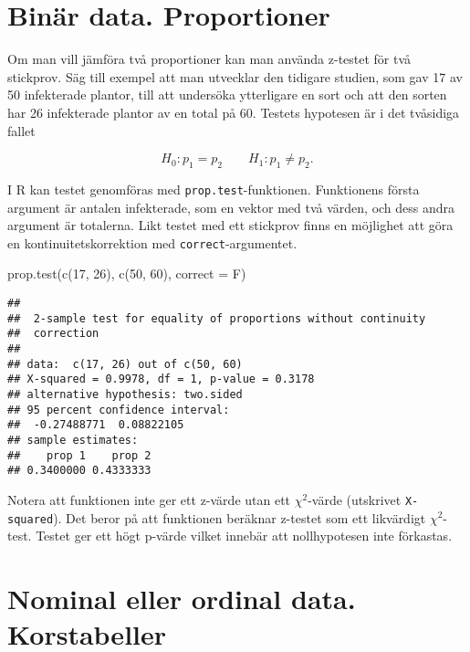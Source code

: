 \documentclass[
]{book}
\newenvironment{Shaded}{\begin{snugshade}}{\end{snugshade}}
\newcommand{\AttributeTok}[1]{\textcolor[rgb]{0.77,0.63,0.00}{#1}}
\newcommand{\DecValTok}[1]{\textcolor[rgb]{0.00,0.00,0.81}{#1}}
\newcommand{\FunctionTok}[1]{\textcolor[rgb]{0.00,0.00,0.00}{#1}}
\newcommand{\NormalTok}[1]{#1}
\theoremstyle{definition}
\theoremstyle{definition}
\theoremstyle{definition}
\theoremstyle{definition}
\theoremstyle{remark}
\begin{document}
\hypertarget{binuxe4r-data.-proportioner-1}{%
\section{Binär data. Proportioner}\label{binuxe4r-data.-proportioner-1}}

Om man vill jämföra två proportioner kan man använda z-testet för två stickprov. Säg till exempel att man utvecklar den tidigare studien, som gav 17 av 50 infekterade plantor, till att undersöka ytterligare en sort och att den sorten har 26 infekterade plantor av en total på 60. Testets hypotesen är i det tvåsidiga fallet

\[H_0: p_1 = p_2 \qquad H_1: p_1 \neq p_2.\]

I R kan testet genomföras med \texttt{prop.test}-funktionen. Funktionens första argument är antalen infekterade, som en vektor med två värden, och dess andra argument är totalerna. Likt testet med ett stickprov finns en möjlighet att göra en kontinuitetskorrektion med \texttt{correct}-argumentet.

\begin{Shaded}
\begin{Highlighting}[]
\FunctionTok{prop.test}\NormalTok{(}\FunctionTok{c}\NormalTok{(}\DecValTok{17}\NormalTok{, }\DecValTok{26}\NormalTok{), }\FunctionTok{c}\NormalTok{(}\DecValTok{50}\NormalTok{, }\DecValTok{60}\NormalTok{), }\AttributeTok{correct =}\NormalTok{ F)}
\end{Highlighting}
\end{Shaded}

\begin{verbatim}
## 
##  2-sample test for equality of proportions without continuity
##  correction
## 
## data:  c(17, 26) out of c(50, 60)
## X-squared = 0.9978, df = 1, p-value = 0.3178
## alternative hypothesis: two.sided
## 95 percent confidence interval:
##  -0.27488771  0.08822105
## sample estimates:
##    prop 1    prop 2 
## 0.3400000 0.4333333
\end{verbatim}

Notera att funktionen inte ger ett z-värde utan ett \(\chi^2\)-värde (utskrivet \texttt{X-squared}). Det beror på att funktionen beräknar z-testet som ett likvärdigt \(\chi^2\)-test.
Testet ger ett högt p-värde vilket innebär att nollhypotesen inte förkastas.

\hypertarget{nominal-eller-ordinal-data.-korstabeller}{%
\section{Nominal eller ordinal data. Korstabeller}\label{nominal-eller-ordinal-data.-korstabeller}}
\end{document}
